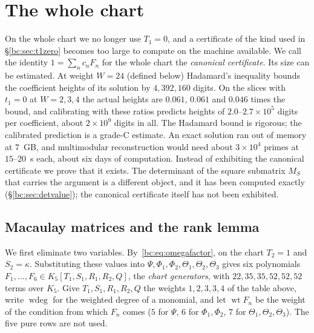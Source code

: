 \documentclass[a4paper,11pt]{article}
\theoremstyle{jsplain}
\theoremstyle{jsdef}
\theoremstyle{jsrem}
\begin{document}
\section{The whole chart}\label{bc:sec:wholechart}

On the whole chart we no longer use $T_1=0$, and a certificate of the kind used in \S\ref{bc:sec:t1zero} becomes too large to compute on the machine available. We call the identity $1=\sum_nc_nF_n$ for the whole chart the \emph{canonical certificate}. Its size can be estimated. At weight $W=24$ (defined below) Hadamard's inequality bounds the coefficient heights of its solution by $4{,}392{,}160$ digits. On the slices with $t_1=0$ at $W=2,3,4$ the actual heights are $0.061$, $0.061$ and $0.046$ times the bound, and calibrating with these ratios predicts heights of $2.0$--$2.7\times10^5$ digits per coefficient, about $2\times10^9$ digits in all. The Hadamard bound is rigorous; the calibrated prediction is a grade-C estimate. An exact solution ran out of memory at $7$~GB, and multimodular reconstruction would need about $3\times10^4$ primes at $15$--$20$~s each, about six days of computation. Instead of exhibiting the canonical certificate we prove that it exists. The determinant of the square submatrix $M_S$ that carries the argument is a different object, and it has been computed exactly (\S\ref{bc:sec:detvalue}); the canonical certificate itself has not been exhibited.

\subsection{Macaulay matrices and the rank lemma}

We first eliminate two variables. By~\eqref{bc:eq:omegafactor}, on the chart $T_2=1$ and $S_2=\kappa$. Substituting these values into $\Psi,\Phi_1,\Phi_2,\Theta_1,\Theta_2,\Theta_3$ gives six polynomials $F_1,\dots,F_6\in K_5[T_1,S_1,R_1,R_2,Q]$, the \emph{chart generators}, with $22,35,35,52,52,52$ terms over $K_5$. Give $T_1,S_1,R_1,R_2,Q$ the weights $1,2,3,3,4$ of the table above, write $\operatorname{wdeg}$ for the weighted degree of a monomial, and let $\operatorname{wt}F_n$ be the weight of the condition from which $F_n$ comes ($5$ for $\Psi$, $6$ for $\Phi_1,\Phi_2$, $7$ for $\Theta_1,\Theta_2,\Theta_3$). The five pure rows are not used.
\end{document}
